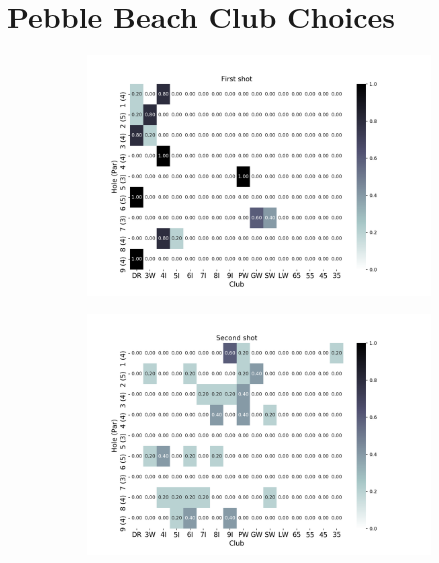\documentclass{kththesis}
\begin{document}
\chapter{Pebble Beach Club Choices}
\label{app:pebble_club_choices}
\begin{figure}
    \centering
    \begin{subfigure}{\textwidth}
    \centering
    \includegraphics[height=0.3\textheight]{L2ClubChoices/Ludvig_Pebble_Club_Choices_First_Shot.png} 
    \end{subfigure}
    \begin{subfigure}{\textwidth}
    \centering
    \includegraphics[height=0.3\textheight]{L2ClubChoices/Ludvig_Pebble_Club_Choices_Second_Shot.png} 
    \end{subfigure}
    \begin{subfigure}{\textwidth}

\end{subfigure}
\end{figure}
\end{document}
